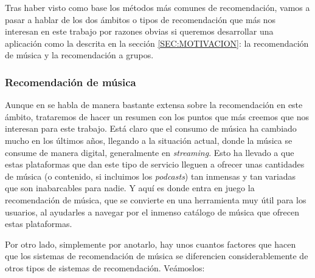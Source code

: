 Tras haber visto como base los métodos más comunes de recomendación, vamos a pasar a hablar de los dos ámbitos o tipos de recomendación que más nos
interesan en este trabajo por razones obvias si queremos desarrollar una aplicación como la descrita en la sección \ref{SEC:MOTIVACION}: 
la recomendación de música y la recomendación a grupos.
    
\subsubsection{Recomendación de música\label{SEC:RECOMENDACION_MUSICA}}

Aunque en \cite{musicrecommender} se habla de manera bastante extensa sobre la recomendación en este ámbito, trataremos de hacer un resumen con los puntos que 
más creemos que nos interesan para este trabajo. Está claro que el consumo de música ha cambiado mucho en los últimos años, llegando a la situación actual,
donde la música se consume de manera digital, generalmente en \textit{streaming}. Esto ha llevado a que estas plataformas que dan este tipo de servicio 
lleguen a ofrecer unas cantidades de música (o contenido, si incluimos los \textit{podcasts}) tan inmensas y tan variadas que son inabarcables para nadie. 
Y aquí es donde entra en juego la recomendación de música, que se convierte en una herramienta muy útil para los usuarios, al ayudarles a navegar por el inmenso
catálogo de música que ofrecen estas plataformas.

Por otro lado, simplemente por anotarlo, hay unos cuantos factores que hacen que los sistemas de recomendación de música se diferencien considerablemente 
de otros tipos de sistemas de recomendación. Veámoslos:

